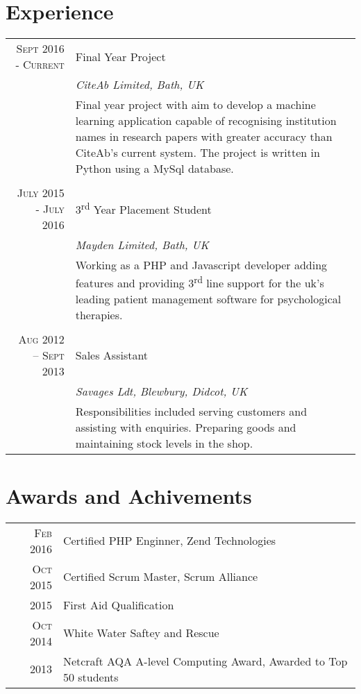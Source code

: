 \documentclass[a4paper,10pt]{article}
\begin{document}
\section{Experience}
\fontsize{10pt}{10pt}\selectfont
\begin{tabular}{r|p{11cm}}
\textsc{Sept} 2016 - \textsc{Current} & Final Year Project \\&\emph{CiteAb Limited, Bath, UK}\\&\normalsize{Final year project with aim to develop a machine learning application capable of recognising institution names
in research papers with greater accuracy than CiteAb's current system. The project is written in Python using a MySql database.}\\\multicolumn{2}{c}{} \\

\textsc{July} 2015 - \textsc{July} 2016 & 3\textsuperscript{rd} Year Placement Student \\&\emph{Mayden Limited, Bath, UK}\\&\normalsize{Working as a PHP and Javascript developer adding features and providing 3\textsuperscript{rd} line support for the uk's leading patient management software for psychological therapies.}\\\multicolumn{2}{c}{} \\
\textsc{Aug} 2012 – \textsc{Sept} 2013 & Sales Assistant\\&\emph{Savages Ldt, Blewbury, Didcot, UK}\\&\normalsize{Responsibilities included serving customers and assisting with enquiries. Preparing goods and maintaining stock levels in the shop.  }\\
\end{tabular}

\section{Awards and Achivements}
\fontsize{12pt}{12pt}\selectfont
\begin{tabular}{rl}
 \textsc{Feb} 2016 & Certified PHP Enginner, Zend Technologies\\
 \textsc{Oct} 2015 & Certified Scrum Master, Scrum Alliance\\
 \textsc{} 2015 & First Aid Qualification\\
 \textsc{Oct} 2014 & White Water Saftey and Rescue\\
 \textsc{} 2013 & Netcraft AQA A-level Computing Award, Awarded to Top 50 students\\
\end{tabular}
\end{document}
